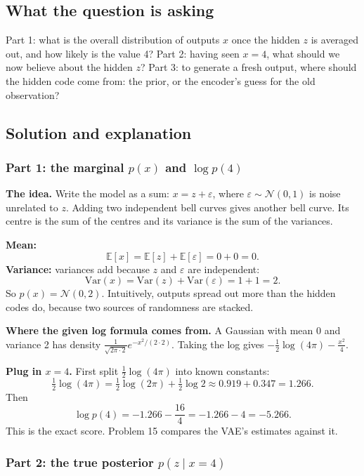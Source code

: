 \documentclass[12pt,a4paper]{article}
\begin{document}
\subsection{What the question is asking}

Part 1: what is the overall distribution of outputs $x$ once the hidden $z$ is averaged out, and how likely is the value 4? Part 2: having seen $x = 4$, what should we now believe about the hidden $z$? Part 3: to generate a fresh output, where should the hidden code come from: the prior, or the encoder's guess for the old observation?

\subsection{Solution and explanation}

\subsubsection{Part 1: the marginal $p(x)$ and $\log p(4)$}

\textbf{The idea.} Write the model as a sum: $x = z + \varepsilon$, where $\varepsilon \sim \mathcal{N}(0,1)$ is noise unrelated to $z$. Adding two independent bell curves gives another bell curve. Its centre is the sum of the centres and its variance is the sum of the variances.

\textbf{Mean:}
\[
\mathbb{E}[x] = \mathbb{E}[z] + \mathbb{E}[\varepsilon] = 0 + 0 = 0.
\]
\textbf{Variance:} variances add because $z$ and $\varepsilon$ are independent:
\[
\mathrm{Var}(x) = \mathrm{Var}(z) + \mathrm{Var}(\varepsilon) = 1 + 1 = 2.
\]
So $p(x) = \mathcal{N}(0, 2)$. Intuitively, outputs spread out more than the hidden codes do, because two sources of randomness are stacked.

\textbf{Where the given log formula comes from.} A Gaussian with mean 0 and variance 2 has density $\frac{1}{\sqrt{2\pi \cdot 2}} e^{-x^2/(2\cdot 2)}$. Taking the log gives $-\tfrac{1}{2}\log(4\pi) - \frac{x^2}{4}$.

\textbf{Plug in $x = 4$.} First split $\tfrac{1}{2}\log(4\pi)$ into known constants:
\[
\tfrac{1}{2}\log(4\pi) = \tfrac{1}{2}\log(2\pi) + \tfrac{1}{2}\log 2 \approx 0.919 + 0.347 = 1.266.
\]
Then
\[
\log p(4) = -1.266 - \frac{16}{4} = -1.266 - 4 = -5.266.
\]
This is the exact score. Problem 15 compares the VAE's estimates against it.

\subsubsection{Part 2: the true posterior $p(z \mid x = 4)$}
\end{document}

